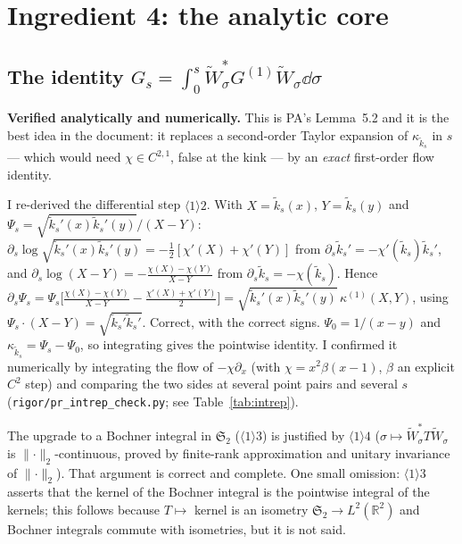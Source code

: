 \documentclass[11pt]{article}
\newcommand{\Wt}{\widetilde W}
\newcommand{\kt}{\widetilde k}
\providecommand{\Stwo}{\mathfrak S_2}\providecommand{\Sone}{\mathfrak S_1}
\providecommand{\norm}[1]{\lVert #1\rVert}\providecommand{\abs}[1]{\lvert #1\rvert}
\begin{document}
\section{Ingredient 4: the analytic core}\label{sec:i4}

\subsection{The identity $G_s=\int_0^s\Wt_\sigma^*G^{(1)}\Wt_\sigma\dd\sigma$}
\textbf{Verified analytically and numerically.}  This is PA's Lemma~5.2 and it is the best idea in
the document: it replaces a second-order Taylor expansion of $\kappa_{\kt_s}$ in $s$ --- which would
need $\chi\in C^{2,1}$, false at the kink --- by an \emph{exact} first-order flow identity.

I re-derived the differential step $\langle1\rangle2$.  With $X=\kt_s(x)$, $Y=\kt_s(y)$ and
$\Psi_s=\sqrt{\kt_s'(x)\kt_s'(y)}/(X-Y)$:
$\partial_s\log\sqrt{\kt_s'(x)\kt_s'(y)}=-\frac12[\chi'(X)+\chi'(Y)]$ from
$\partial_s\kt_s'=-\chi'(\kt_s)\kt_s'$, and
$\partial_s\log(X-Y)=-\frac{\chi(X)-\chi(Y)}{X-Y}$ from $\partial_s\kt_s=-\chi(\kt_s)$.  Hence
$\partial_s\Psi_s=\Psi_s\bigl[\frac{\chi(X)-\chi(Y)}{X-Y}-\frac{\chi'(X)+\chi'(Y)}2\bigr]
=\sqrt{\kt_s'(x)\kt_s'(y)}\,\kappa^{(1)}(X,Y)$, using $\Psi_s\cdot(X-Y)=\sqrt{\kt_s'\kt_s'}$.
Correct, with the correct signs.  $\Psi_0=1/(x-y)$ and $\kappa_{\kt_s}=\Psi_s-\Psi_0$, so integrating
gives the pointwise identity.  I confirmed it numerically by integrating the flow of
$-\chi\partial_x$ (with $\chi=x^2\beta(x-1)$, $\beta$ an explicit $C^2$ step) and comparing the two
sides at several point pairs and several $s$ (\texttt{rigor/pr\_intrep\_check.py}; see
Table~\ref{tab:intrep}).

The upgrade to a Bochner integral in $\Stwo$ ($\langle1\rangle3$) is justified by
$\langle1\rangle4$ ($\sigma\mapsto\Wt_\sigma^*T\Wt_\sigma$ is $\norm\cdot_2$-continuous, proved by
finite-rank approximation and unitary invariance of $\norm\cdot_2$).  That argument is correct and
complete.  One small omission: $\langle1\rangle3$ asserts that the kernel of the Bochner integral is
the pointwise integral of the kernels; this follows because $T\mapsto$ kernel is an isometry
$\Stwo\to L^2(\mathbb R^2)$ and Bochner integrals commute with isometries, but it is not said.
\end{document}
